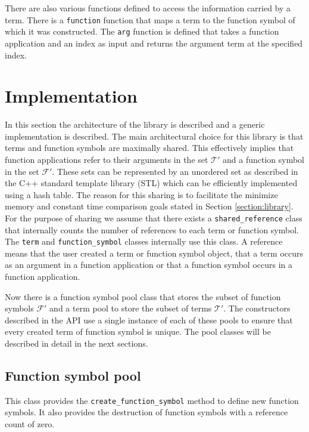 \documentclass[10pt,a4paper]{article}
\newcommand{\functionsymbols}{\mathcal{F}}
\newcommand{\terms}{\mathcal{T}}
\begin{document}
There are also various functions defined to access the information carried by a term. 
There is a \verb|function| function that maps a term to the function symbol of which it was constructed. 
The \verb|arg| function is defined that takes a function application and an index as input and returns the argument term at the specified index.

\section{Implementation}\label{section:implementation}

In this section the architecture of the library is described and a generic implementation is described. 
The main architectural choice for this library is that terms and function symbols are maximally shared. 
This effectively implies that function applications refer to their arguments in the set $\terms'$ and a function symbol in the set $\functionsymbols'$.
These sets can be represented by an unordered set as described in the C++ standard template library (STL) which can be efficiently implemented using a hash table.
The reason for this sharing is to facilitate the minimize memory and constant time comparison goals stated in Section \ref{section:library}.
For the purpose of sharing we assume that there exists a \verb|shared_reference| class that internally counts the number of references to each term or function symbol.
The \texttt{term} and \texttt{function\_symbol} classes internally use this class.
A reference means that the user created a term or function symbol object, that a term occurs as an argument in a function application or that a function symbol occurs in a function application.

Now there is a function symbol pool class that stores the subset of function symbols $\functionsymbols'$ and a term pool to store the subset of terms $\terms'$.
The constructors described in the API use a single instance of each of these pools to ensure that every created term of function symbol is unique.
The pool classes will be described in detail in the next sections.

\subsection{Function symbol pool}

This class provides the \verb|create_function_symbol| method to define new function symbols.
It also provides the destruction of function symbols with a reference count of zero.
\end{document}
